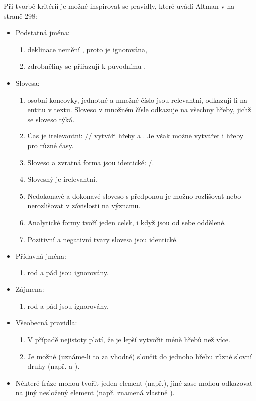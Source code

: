 \documentclass[dp.tex]{subfiles}
\begin{document}
Při tvorbě kritérií je možné inspirovat se pravidly, které uvádí Altman v \cite{Wimmer2003} na straně 298:
\begin{oldquote}
\begin{itemize}
\item Podstatná jména:
\begin{enumerate}
\item deklinace nemění  , proto je ignorována,
\item zdrobněliny se přiřazují k původnímu .
\end{enumerate}
\item Slovesa:
\begin{enumerate}
\item osobní koncovky, jednotné a množné číslo jsou relevantní, odkazují-li na entitu v textu. Sloveso v množném čísle odkazuje na všechny hřeby, jichž se sloveso týká.
\item Čas je irelevantní: // vytváří hřeby  a . Je však možné vytvářet i hřeby pro různé časy.
\item Sloveso a zvratná forma jsou identické: /.
\item Slovesný  je irelevantní.
\item Nedokonavé a dokonavé sloveso s předponou je možno rozlišovat nebo nerozlišovat v závislosti na významu.
\item Analytické formy tvoří jeden celek, i když jsou od sebe oddělené.
\item Pozitivní a negativní tvary slovesa jsou identické.
\end{enumerate}
\item Přídavná jména:
\begin{enumerate}
\item rod a pád jsou ignorovány.
\end{enumerate}
\item Zájmena:
\begin{enumerate}
\item rod a pád jsou ignorovány.
\end{enumerate}
\item Všeobecná pravidla:
\begin{enumerate}
\item V případě nejistoty platí, že je lepší vytvořit méně hřebů než více.
\item Je možné (uznáme-li to za vhodné) sloučit do jednoho hřebu různé slovní druhy (např.  a ).
\end{enumerate}
\item Některé fráze mohou tvořit jeden element (např.), jiné zase mohou odkazovat na jiný nesložený element (např.  znamená vlastně ).
\end{itemize}
\end{oldquote}
\end{document}
